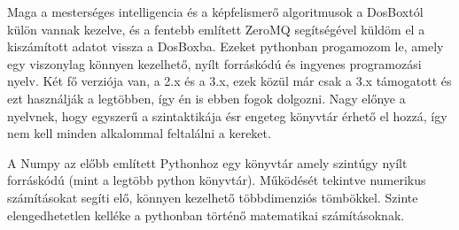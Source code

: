 
Maga a mesterséges intelligencia és a képfelismerő algoritmusok a DosBoxtól külön vannak kezelve, és a fentebb említett ZeroMQ segítségével küldöm el a kiszámított adatot vissza a DosBoxba. Ezeket pythonban progamozom le, amely egy viszonylag könnyen kezelhető, nyílt forráskódú és ingyenes programozási nyelv. Két fő verziója van, a 2.x és a 3.x, ezek közül már csak a 3.x támogatott és ezt használják a legtöbben, így én is ebben fogok dolgozni. Nagy előnye a nyelvnek, hogy egyszerű a szintaktikája ésr engeteg könyvtár érhető el hozzá, így nem kell minden alkalommal feltalálni a kereket.



A Numpy az előbb említett Pythonhoz egy könyvtár amely szintúgy nyílt forráskódú (mint a legtöbb python könyvtár). Működését tekintve numerikus számításokat segíti elő, könnyen kezelhető többdimenziós tömbökkel. Szinte elengedhetetlen kelléke a pythonban történő matematikai számításoknak.
\iffalse
\Section{Tesseract OCR és pytesseract}

\fi
